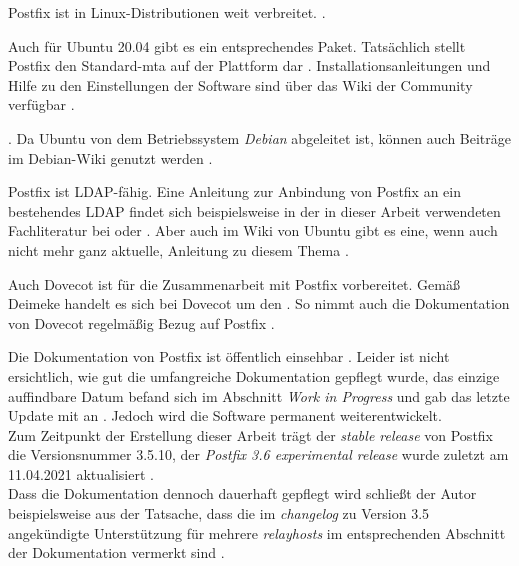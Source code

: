 Postfix ist in Linux-Distributionen weit verbreitet.  \citep[][53]{Heinlein2004}.

Auch für Ubuntu 20.04 gibt es ein entsprechendes Paket. Tatsächlich stellt Postfix den Standard-\ac{mta} auf der Plattform dar \citep[vgl.][]{ubuntupostfix}.
Installationsanleitungen und Hilfe zu den Einstellungen der Software sind über das Wiki der Community verfügbar \citep[vgl.][]{ubuntupostfixwiki}. 

 \citep[][]{ubuntupostfix}. Da Ubuntu von dem Betriebssystem \textit{Debian} abgeleitet ist, können auch Beiträge im Debian-Wiki genutzt werden \citep[vgl.][]{debianpostfix}. 

Postfix ist LDAP-fähig.
Eine Anleitung zur Anbindung von Postfix an ein bestehendes LDAP findet sich beispielsweise in der in dieser Arbeit verwendeten Fachliteratur bei \cite[S. 689 ff.]{Deimeke2019} oder \cite[S. 106 f.]{Heinlein2004}. Aber auch im Wiki von Ubuntu gibt es eine, wenn auch nicht mehr ganz aktuelle, Anleitung zu diesem Thema \citep[vgl.][]{ubuntudovecotLDAPwiki}.

Auch Dovecot ist für die Zusammenarbeit mit Postfix vorbereitet. 
Gemäß Deimeke handelt es sich bei Dovecot um den  \citep[][338]{Deimeke2019}. 
So nimmt auch die Dokumentation von Dovecot regelmäßig Bezug auf Postfix \citep[vgl. z.B.][]{DovecotPostfix}.

Die Dokumentation von Postfix ist öffentlich einsehbar \citep[vgl.][]{postfixdoku}. Leider ist nicht ersichtlich, wie gut die umfangreiche Dokumentation gepflegt wurde, das einzige auffindbare Datum befand sich im Abschnitt \textit{Work in Progress} und gab das letzte Update mit  an \citep[vgl.][]{postfixwip}. Jedoch wird die Software permanent weiterentwickelt. \\
Zum Zeitpunkt der Erstellung dieser Arbeit trägt der \textit{stable release} von Postfix die Versionsnummer 3.5.10, der \textit{Postfix 3.6 experimental release} wurde zuletzt am 11.04.2021 aktualisiert \citep[vgl.][]{postfixsource}. \\
Dass die Dokumentation dennoch dauerhaft gepflegt wird schließt der Autor beispielsweise aus der Tatsache, dass die im \textit{changelog} zu Version 3.5 angekündigte Unterstützung für mehrere \textit{relayhosts} \citep[vgl.][]{postfixcl35} im entsprechenden Abschnitt der Dokumentation vermerkt sind \citep[vgl.][]{postfixrelayhost}.

